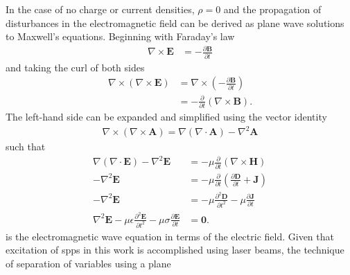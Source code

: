 In the case of no charge or current densities, $\rho=0$ and
the propagation of disturbances in the electromagnetic field can be derived
as plane wave solutions to Maxwell's equations.  Beginning with Faraday's law
\begin{align}
  \nabla \times \mathbf{E} & = -\frac{\partial \mathbf{B}} {\partial t}
\end{align}
and taking the curl of both sides
\begin{align}
  \nabla \times
  \left(\nabla\times\mathbf{E}\right) & =\nabla\times\left(-\frac{\partial\mathbf{B}}{\partial
    t}\right)                                                                                               \\
                                      & =-\frac{\partial}{\partial t}\left(\nabla \times \mathbf{B}\right).
\end{align}
The left-hand side can be expanded and simplified using the vector identity
\begin{align}
  \nabla \times \left( \nabla \times \mathbf{A} \right) = \nabla \left(
  \nabla \cdot \mathbf{A} \right) - \nabla^2 \mathbf{A}
\end{align}
such that
\begin{align}
  \nabla\left(\nabla\cdot\mathbf{E}\right)-\nabla^2\mathbf{E}
                                                                                                                            & =-\mu\frac{\partial}{\partial t}\left(\nabla \times \mathbf{H}\right)                             \\
  -\nabla^2\mathbf{E}                                                                                                       & =-\mu\frac{\partial}{\partial t}\left( \frac{\partial \mathbf{D}}{\partial t} + \mathbf{J}\right) \\
  -\nabla^2\mathbf{E}                                                                                                       & =-\mu\frac{\partial^2 \mathbf{D}}{\partial t^2} -\mu\frac{\partial\mathbf{J}}{\partial t}         \\
  \nabla^2\mathbf{E} -\mu\epsilon\frac{\partial^2 \mathbf{E}}{\partial t^2} -\mu\sigma\frac{\partial\mathbf{E}}{\partial t} & = \mathbf{0}.
  \label{eqn:ewe}
\end{align}
 is the electromagnetic wave equation in terms of the
electric field.  Given that excitation of \glspl{spp} in this work is accomplished
using laser beams, the technique of separation of variables using a plane
